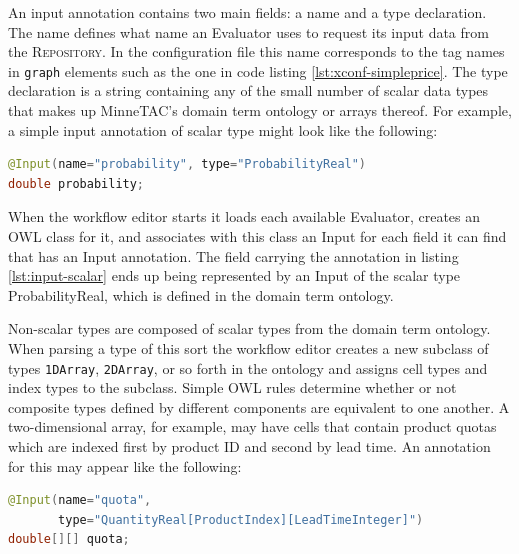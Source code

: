 \documentclass{article}
\begin{document}
An input annotation contains two main fields:  a name and a type declaration.
The name defines what name an Evaluator uses to request its input data from the \textsc{Repository}.
In the configuration file this name corresponds to the tag names in \texttt{graph} elements such as the one in code listing \ref{lst:xconf-simpleprice}.
The type declaration is a string containing any of the small number of scalar data types that makes up MinneTAC's domain term ontology or arrays thereof.
For example, a simple input annotation of scalar type might look like the following:

{\small
\begin{lstlisting}[language={Java},frame={single},label={lst:input-scalar},caption={An Input annotation with scalar type}]
@Input(name="probability", type="ProbabilityReal")
double probability;
\end{lstlisting}
}

When the workflow editor starts it loads each available Evaluator, creates an OWL class for it, and associates with this class an Input for each field it can find that has an Input annotation.
The field carrying the annotation in listing \ref{lst:input-scalar} ends up being represented by an Input of the scalar type ProbabilityReal, which is defined in the domain term ontology.

Non-scalar types are composed of scalar types from the domain term ontology.
When parsing a type of this sort the workflow editor creates a new subclass of types \texttt{1DArray}, \texttt{2DArray}, or so forth in the ontology and assigns cell types and index types to the subclass.
Simple OWL rules determine whether or not composite types defined by different components are equivalent to one another.
A two-dimensional array, for example, may have cells that contain product quotas which are indexed first by product ID and second by lead time.
An annotation for this may appear like the following:

{\small
\begin{lstlisting}[language={Java},frame={single},label={lst:input-composite},caption={An Input annotation with composite type}]
@Input(name="quota",
       type="QuantityReal[ProductIndex][LeadTimeInteger]")
double[][] quota;
\end{lstlisting}
}
\end{document}

